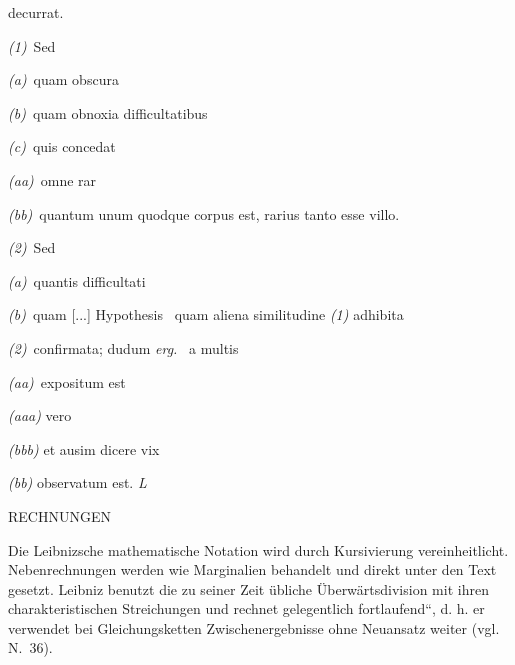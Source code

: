 \vspace{1.0ex}
 decurrat.\par\noindent
\hspace{3mm}\textit{(1)}\ Sed\par\noindent
\hspace{8mm}\textit{(a)}\ quam obscura\par\noindent
\hspace{8mm}\textit{(b)}\ quam obnoxia difficultatibus\par\noindent
\hspace{8mm}\textit{(c)}\ quis concedat\par\noindent
\hspace{18mm}\textit{(aa)}\ omne rar\par\noindent
\hspace{18mm}\textit{(bb)}\ quantum unum quodque corpus est, rarius tanto esse villo.\par\noindent
\hspace{3mm}\textit{(2)}\ Sed\par\noindent
\hspace{8mm}\textit{(a)}\ quantis difficultati\par\noindent
\hspace{8mm}\textit{(b)}\ quam [...] Hypothesis \textbar\ quam aliena similitudine \textit{(1)} adhibita\par\noindent
\hspace{8.3cm}\textit{(2)}\ confirmata; dudum \textit{erg.} \textbar\ a
multis\par\noindent
\hspace{18mm}\textit{(aa)}\ expositum est\par\noindent
\hspace{23mm}\textit{(aaa)} vero\par\noindent
\hspace{23mm}\textit{(bbb)} et ausim dicere vix\par\noindent
\hspace{18mm}\textit{(bb)} observatum est. \textit{L}
\par\vspace{3.0ex}
\normalsize
\clearpage
\uppercase{Rechnungen}\par\vspace{1.0ex}
Die Leibnizsche mathematische Notation wird durch Kursivierung verein\-heitlicht. Nebenrechnungen werden wie Marginalien behandelt und direkt unter den Text gesetzt. Leibniz benutzt die zu seiner Zeit \"{u}bliche \"{U}berw\"{a}rtsdivision mit ihren charakteristischen Streichungen und rechnet gelegentlich \glqq fortlaufend``, d. h. er verwendet bei Gleichungsketten Zwischenergebnisse ohne Neuansatz weiter (vgl. N.~36).\par
